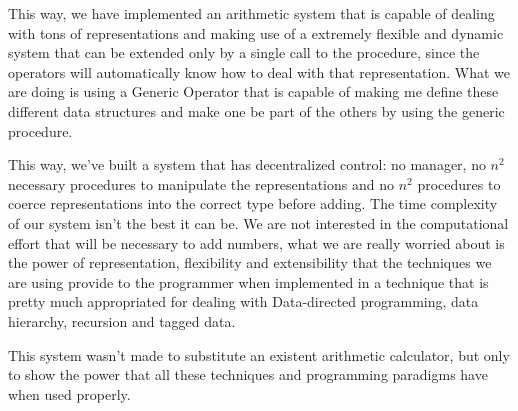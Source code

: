 This way, we have implemented an arithmetic system that is capable of dealing with tons of representations and making use of a extremely flexible and dynamic system that can be extended only by a single call to the  procedure, since the operators will automatically know how to deal with that representation. What we are doing is using a Generic Operator  that is capable of making me define these different data structures and make one be part of the others by using the generic  procedure.

This way, we've built a system that has decentralized control: no manager, no $n^2$ necessary procedures to manipulate the representations and no $n^2$ procedures to coerce representations into the correct type before adding. The time complexity of our system isn't the best it can be. We are not interested in the computational effort that will be necessary to add numbers, what we are really worried about is the power of representation, flexibility and extensibility that the techniques we are using provide to the programmer when implemented in a technique that is pretty much appropriated for dealing with Data-directed programming, data hierarchy, recursion and tagged data.

This system wasn't made to substitute an existent arithmetic calculator, but only to show the power that all these techniques and programming paradigms have when used properly.



